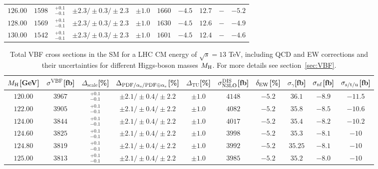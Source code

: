 \begin{table}[ht!]
\begin{center}
\begin{small}
\begin{tabular}{cccccccc|cc}
$126.00$ & $1598$ & $^{+0.1}_{-0.1}$ & $\pm 2.3/\pm 0.3/\pm 2.3$ & $\pm 1.0$ & $1660$ & $-4.5$ & $12.7$ & $-$ & $-5.2$ \\
$128.00$ & $1569$ & $^{+0.1}_{-0.1}$ & $\pm 2.3/\pm 0.3/\pm 2.3$ & $\pm 1.0$ & $1630$ & $-4.5$ & $12.6$ & $-$ & $-4.9$ \\
$130.00$ & $1542$ & $^{+0.1}_{-0.1}$ & $\pm 2.3/\pm 0.3/\pm 2.3$ & $\pm 1.0$ & $1601$ & $-4.5$ & $12.4$ & $-$ & $-4.6$ \\
\bottomrule
\end{tabular}%
\end{small}%
\end{center}%
\end{table}

\begin{table}[ht!]
\caption{Total VBF cross sections in the SM for a LHC CM energy of $\sqrt{s}=13$ TeV, including QCD and EW corrections
and their uncertainties for different Higgs-boson masses $M_\mathrm{H}$. For more details see section~\ref{sec:VBF}.}
\label{tab:vbf_XStot_13}
\begin{center}%
\begin{small}%
\begin{tabular}{cccccccc|cc}%
\toprule
$M_\mathrm{H}$[GeV] & $\sigma^{\mathrm{VBF}}$[fb] & $\Delta_{\mathrm{scale}}$[\%] & $\Delta_{\mathrm{PDF}/\alpha_{\mathrm{s}}/\mathrm{PDF\oplus\alpha_{\mathrm{s}}}}$[\%] & $\Delta_{\mathrm{TU}}$[\%] &
$\sigma_{\mathrm{N3LO}}^{\mathrm{DIS}}$[fb] & $\delta_{\mathrm{EW}}$[\%] & $\sigma_{\gamma}$[fb] & $\sigma_{\mbox{\scriptsize nf}}$[fb] & $\sigma_{\mbox{\scriptsize s/t/u}}$[fb]
\\
\midrule
$120.00$ & $3967$ & $^{+0.1}_{-0.1}$ & $\pm 2.1/\pm 0.4/\pm 2.2$ & $\pm 1.0$ & $4148$ & $-5.2$ & $36.1 $ & $-8.9$ & $-11.5$ \\
$122.00$ & $3905$ & $^{+0.1}_{-0.1}$ & $\pm 2.1/\pm 0.4/\pm 2.2$ & $\pm 1.0$ & $4082$ & $-5.2$ & $35.8 $ & $-8.5$ & $-10.6$ \\
$124.00$ & $3844$ & $^{+0.1}_{-0.1}$ & $\pm 2.1/\pm 0.4/\pm 2.2$ & $\pm 1.0$ & $4017$ & $-5.2$ & $35.4 $ & $-8.2$ & $-10.2$ \\
$124.60$ & $3825$ & $^{+0.1}_{-0.1}$ & $\pm 2.1/\pm 0.4/\pm 2.2$ & $\pm 1.0$ & $3998$ & $-5.2$ & $35.3 $ & $-8.1$ & $-10  $ \\
$124.80$ & $3819$ & $^{+0.1}_{-0.1}$ & $\pm 2.1/\pm 0.4/\pm 2.2$ & $\pm 1.0$ & $3992$ & $-5.2$ & $35.25$ & $-8.1$ & $-10  $ \\
$125.00$ & $3813$ & $^{+0.1}_{-0.1}$ & $\pm 2.1/\pm 0.4/\pm 2.2$ & $\pm 1.0$ & $3985$ & $-5.2$ & $35.2 $ & $-8.0$ & $-10  $ \\

\end{tabular}
\end{small}
\end{center}
\end{table}
